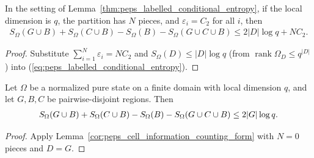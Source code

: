 \begin{lemma}
    \label{cor:peps_cell_information_counting_form}
    \leanok
    In the setting of Lemma~\ref{thm:peps_labelled_conditional_entropy}, if
    the local dimension is $q$, the partition has $N$ pieces, and
    $\varepsilon_i=C_2$ for all $i$, then
    \begin{align}
        S_\Omega(G\cup B)+S_\Omega(C\cup B)-S_\Omega(B)-S_\Omega(G\cup C\cup B)
        \le 2\lvert D\rvert\log q+NC_2.
        \label{eq:peps_cell_information_counting_form}
    \end{align}
\end{lemma}
\begin{proof}\leanok
    Substitute $\sum_{i=1}^N\varepsilon_i=NC_2$ and $S_\Omega(D)\le\lvert D\rvert\log q$
    (from $\operatorname{rank}\Omega_D\le q^{\lvert D\rvert}$) into (\ref{eq:peps_labelled_conditional_entropy}).
\end{proof}

\begin{corollary}
    \label{cor:peps_small_cell_information}
    \leanok
    Let $\Omega$ be a normalized pure state on a finite domain with local
    dimension $q$, and let $G,B,C$ be pairwise-disjoint regions. Then
    \begin{align}
        S_\Omega(G\cup B)+S_\Omega(C\cup B)-S_\Omega(B)-S_\Omega(G\cup C\cup B)
        \le 2\lvert G\rvert\log q.
        \notag
    \end{align}
\end{corollary}
\begin{proof}\leanok
    Apply Lemma~\ref{cor:peps_cell_information_counting_form} with $N=0$ pieces and $D=G$.
\end{proof}

